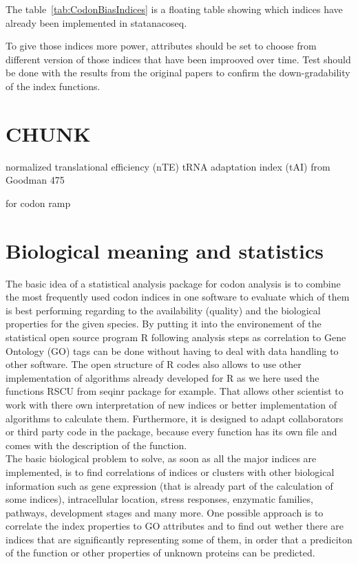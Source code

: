 The table~\ref{tab:CodonBiasIndices} is a floating table showing which indices have already been implemented in statanacoseq.

To give those indices more power, attributes should be set to choose from different version of those indices that have been improoved over time. Test should be done with the results from the original papers to confirm the down-gradability of the index functions.

\section{CHUNK}
normalized translational efficiency (nTE)
tRNA adaptation index (tAI) from Goodman 475
\cite{Goodman2013}

\cite{Tuller2010} for codon ramp



\section{Biological meaning and statistics}
The basic idea of a statistical analysis package for codon analysis is to combine the most frequently used codon indices in one software to evaluate which of them is best performing regarding to the availability (quality) and the biological properties for the given species. By putting it into the environement of the statistical open source program R following analysis steps as correlation to Gene Ontology (GO) tags can be done without having to deal with data handling to other software. The open structure of R codes also allows to use other implementation of algorithms already developed for R as we here used the functions RSCU from seqinr package for example. That allows other scientist to work with there own interpretation of new indices or better implementation of algorithms to calculate them. Furthermore, it is designed to adapt collaborators or third party code in the package, because every function has its own file and comes with the description of the function.\\
The basic biological problem to solve, as soon as all the major indices are implemented, is to find correlations of indices or clusters with other biological information such as gene expression (that is already part of the calculation of some indices), intracellular location, stress responses, enzymatic families, pathways, development stages and many more. One possible approach is to correlate the index properties to GO attributes and to find out wether there are indices that are significantly representing some of them, in order that a prediciton of the function or other properties of unknown proteins can be predicted.\\

